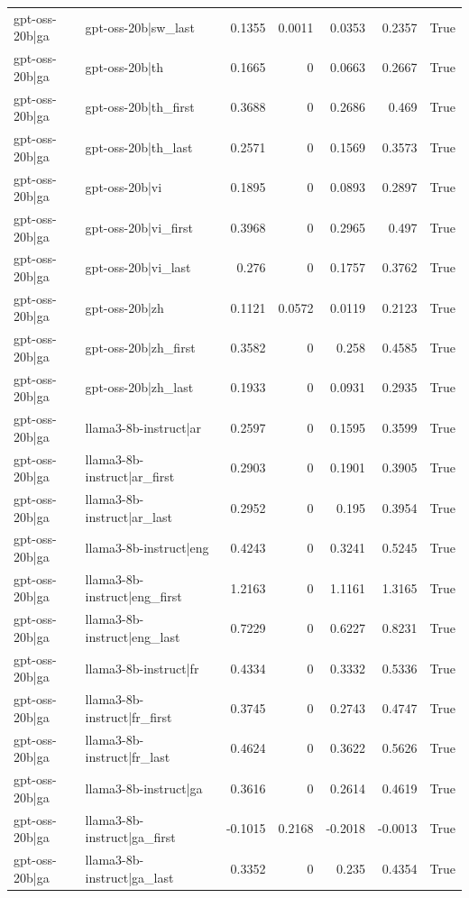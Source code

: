 \begin{table}
\begin{tabular}{l l r r r r l}
gpt-oss-20b|ga & gpt-oss-20b|sw_last & 0.1355 & 0.0011 & 0.0353 & 0.2357 & True \\
gpt-oss-20b|ga & gpt-oss-20b|th & 0.1665 & 0 & 0.0663 & 0.2667 & True \\
gpt-oss-20b|ga & gpt-oss-20b|th_first & 0.3688 & 0 & 0.2686 & 0.469 & True \\
gpt-oss-20b|ga & gpt-oss-20b|th_last & 0.2571 & 0 & 0.1569 & 0.3573 & True \\
gpt-oss-20b|ga & gpt-oss-20b|vi & 0.1895 & 0 & 0.0893 & 0.2897 & True \\
gpt-oss-20b|ga & gpt-oss-20b|vi_first & 0.3968 & 0 & 0.2965 & 0.497 & True \\
gpt-oss-20b|ga & gpt-oss-20b|vi_last & 0.276 & 0 & 0.1757 & 0.3762 & True \\
gpt-oss-20b|ga & gpt-oss-20b|zh & 0.1121 & 0.0572 & 0.0119 & 0.2123 & True \\
gpt-oss-20b|ga & gpt-oss-20b|zh_first & 0.3582 & 0 & 0.258 & 0.4585 & True \\
gpt-oss-20b|ga & gpt-oss-20b|zh_last & 0.1933 & 0 & 0.0931 & 0.2935 & True \\
gpt-oss-20b|ga & llama3-8b-instruct|ar & 0.2597 & 0 & 0.1595 & 0.3599 & True \\
gpt-oss-20b|ga & llama3-8b-instruct|ar_first & 0.2903 & 0 & 0.1901 & 0.3905 & True \\
gpt-oss-20b|ga & llama3-8b-instruct|ar_last & 0.2952 & 0 & 0.195 & 0.3954 & True \\
gpt-oss-20b|ga & llama3-8b-instruct|eng & 0.4243 & 0 & 0.3241 & 0.5245 & True \\
gpt-oss-20b|ga & llama3-8b-instruct|eng_first & 1.2163 & 0 & 1.1161 & 1.3165 & True \\
gpt-oss-20b|ga & llama3-8b-instruct|eng_last & 0.7229 & 0 & 0.6227 & 0.8231 & True \\
gpt-oss-20b|ga & llama3-8b-instruct|fr & 0.4334 & 0 & 0.3332 & 0.5336 & True \\
gpt-oss-20b|ga & llama3-8b-instruct|fr_first & 0.3745 & 0 & 0.2743 & 0.4747 & True \\
gpt-oss-20b|ga & llama3-8b-instruct|fr_last & 0.4624 & 0 & 0.3622 & 0.5626 & True \\
gpt-oss-20b|ga & llama3-8b-instruct|ga & 0.3616 & 0 & 0.2614 & 0.4619 & True \\
gpt-oss-20b|ga & llama3-8b-instruct|ga_first & -0.1015 & 0.2168 & -0.2018 & -0.0013 & True \\
gpt-oss-20b|ga & llama3-8b-instruct|ga_last & 0.3352 & 0 & 0.235 & 0.4354 & True \\

\end{tabular}
\end{table}
